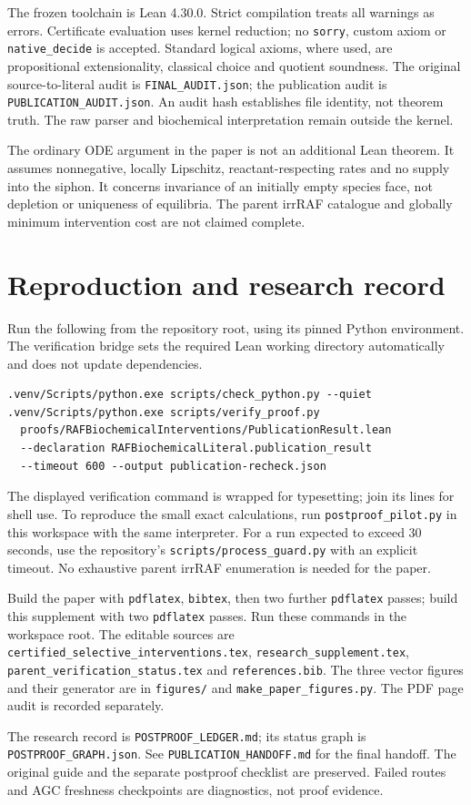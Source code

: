 \documentclass[10pt]{article}
\begin{document}
The frozen toolchain is Lean 4.30.0. Strict compilation treats all warnings as errors. Certificate evaluation uses kernel reduction; no \texttt{sorry}, custom axiom or \texttt{native\_decide} is accepted. Standard logical axioms, where used, are propositional extensionality, classical choice and quotient soundness. The original source-to-literal audit is \texttt{FINAL\_AUDIT.json}; the publication audit is \texttt{PUBLICATION\_AUDIT.json}. An audit hash establishes file identity, not theorem truth. The raw parser and biochemical interpretation remain outside the kernel.

The ordinary ODE argument in the paper is not an additional Lean theorem. It assumes nonnegative, locally Lipschitz, reactant-respecting rates and no supply into the siphon. It concerns invariance of an initially empty species face, not depletion or uniqueness of equilibria. The parent irrRAF catalogue and globally minimum intervention cost are not claimed complete.
\section{Reproduction and research record}
Run the following from the repository root, using its pinned Python environment. The verification bridge sets the required Lean working directory automatically and does not update dependencies.
{\footnotesize\begin{verbatim}
.venv/Scripts/python.exe scripts/check_python.py --quiet
.venv/Scripts/python.exe scripts/verify_proof.py 
  proofs/RAFBiochemicalInterventions/PublicationResult.lean
  --declaration RAFBiochemicalLiteral.publication_result
  --timeout 600 --output publication-recheck.json
\end{verbatim}}
The displayed verification command is wrapped for typesetting; join its lines for shell use. To reproduce the small exact calculations, run \texttt{postproof\_pilot.py} in this workspace with the same interpreter. For a run expected to exceed 30 seconds, use the repository's \texttt{scripts/process\_guard.py} with an explicit timeout. No exhaustive parent irrRAF enumeration is needed for the paper.

Build the paper with \texttt{pdflatex}, \texttt{bibtex}, then two further \texttt{pdflatex} passes; build this supplement with two \texttt{pdflatex} passes. Run these commands in the workspace root. The editable sources are \texttt{certified\_selective\_interventions.tex}, \texttt{research\_supplement.tex}, \texttt{parent\_verification\_status.tex} and \texttt{references.bib}. The three vector figures and their generator are in \texttt{figures/} and \texttt{make\_paper\_figures.py}. The PDF page audit is recorded separately.

The research record is \texttt{POSTPROOF\_LEDGER.md}; its status graph is \texttt{POSTPROOF\_GRAPH.json}. See \texttt{PUBLICATION\_HANDOFF.md} for the final handoff. The original guide and the separate postproof checklist are preserved. Failed routes and AGC freshness checkpoints are diagnostics, not proof evidence.
\end{document}
